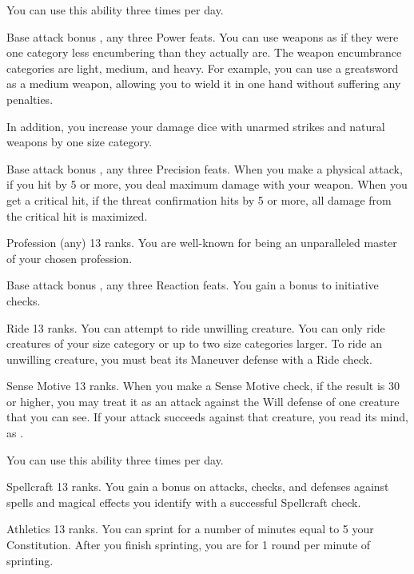 You can use this ability three times per day.

\featpres Base attack bonus , any three Power feats.
\featben You can use weapons as if they were one category less encumbering than they actually are. The weapon encumbrance categories are light, medium, and heavy. For example, you can use a greatsword as a medium weapon, allowing you to wield it in one hand without suffering any penalties.

In addition, you increase your damage dice with unarmed strikes and natural weapons by one size category.

\featpre Base attack bonus , any three Precision feats.
\featben When you make a physical attack, if you hit by 5 or more, you deal maximum damage with your weapon. When you get a critical hit, if the threat confirmation hits by 5 or more, all damage from the critical hit is maximized.

\featpre Profession (any) 13 ranks.
\featben You are well-known for being an unparalleled master of your chosen profession.

\featpre Base attack bonus , any three Reaction feats.
\featben You gain a  bonus to initiative checks.

\featpre Ride 13 ranks.
\featben You can attempt to ride unwilling creature. You can only ride creatures of your size category or up to two size categories larger. To ride an unwilling creature, you must beat its Maneuver defense with a Ride check.

\featpre Sense Motive 13 ranks.
\featben When you make a Sense Motive check, if the result is 30 or higher, you may treat it as an attack against the Will defense of one creature that you can see. If your attack succeeds against that creature, you read its mind, as .

You can use this ability three times per day.

\featpre Spellcraft 13 ranks.
\featben You gain a  bonus on attacks, checks, and defenses against spells and magical effects you identify with a successful Spellcraft check.

\featpre Athletics 13 ranks.
\featben You can sprint for a number of minutes equal to 5 \add your Constitution. After you finish sprinting, you are \fatigued for 1 round per minute of sprinting.


